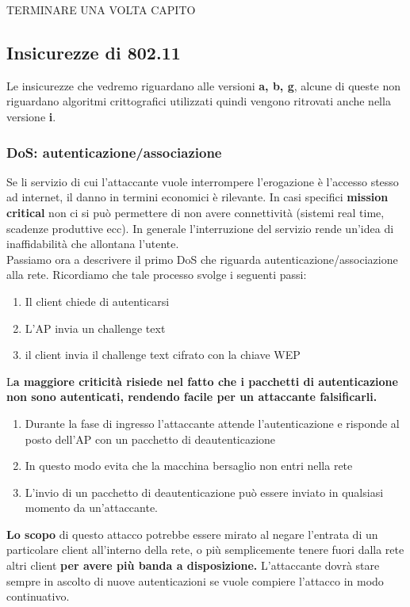 \documentclass[12pt]{article}
\begin{document}
				TERMINARE UNA VOLTA CAPITO\\
				
		\subsection{Insicurezze di 802.11}
			Le insicurezze che vedremo riguardano alle versioni \textbf{a, b, g}, alcune di queste non riguardano algoritmi crittografici utilizzati quindi vengono ritrovati anche nella versione \textbf{i}. 
			\subsubsection{DoS: autenticazione/associazione}
				Se li servizio di cui l'attaccante vuole interrompere l'erogazione è l'accesso stesso ad internet, il danno in termini economici è rilevante. In casi specifici \textbf{mission critical} non ci si può permettere di non avere connettività (sistemi real time, scadenze produttive ecc). In generale l'interruzione del servizio rende un'idea di inaffidabilità che allontana l'utente.\\
				Passiamo ora a descrivere il primo DoS che riguarda autenticazione/associazione alla rete. Ricordiamo che tale processo svolge i seguenti passi:
				\begin{enumerate}
					\item Il client chiede di autenticarsi
					\item L'AP invia un challenge text
					\item il client invia il challenge text cifrato con la chiave WEP
				\end{enumerate}
				L\textbf{a maggiore criticità risiede nel fatto che i pacchetti di autenticazione non sono autenticati, rendendo facile per un attaccante falsificarli.}
				\begin{enumerate}
					\item Durante la fase di ingresso l'attaccante attende l'autenticazione e risponde al posto dell'AP con un pacchetto di deautenticazione
					\item In questo modo evita che la macchina bersaglio non entri nella rete
					\item L'invio di un pacchetto di deautenticazione può essere inviato in qualsiasi momento da un'attaccante.
				\end{enumerate}
				\textbf{Lo scopo} di questo attacco potrebbe essere mirato al negare l'entrata di un particolare client all'interno della rete, o più semplicemente tenere fuori dalla rete altri client\textbf{ per avere più banda a disposizione.} L'attaccante dovrà stare sempre in ascolto di nuove autenticazioni se vuole compiere l'attacco in modo continuativo.\\
\end{document}
